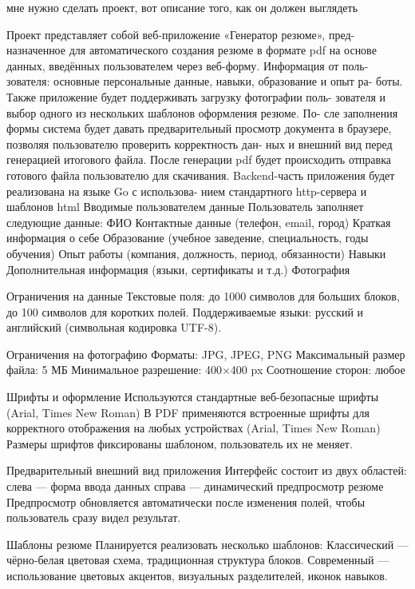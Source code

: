 \documentclass[a4paper, 14pt]{extarticle} %
\begin{document}
\begin{PromptBlock}
мне нужно сделать проект, вот описание того, как он должен выглядеть

Проект представляет собой веб-приложение «Генератор резюме», пред-
назначенное для автоматического создания резюме в формате pdf на основе
данных, введённых пользователем через веб-форму. Информация от поль-
зователя: основные персональные данные, навыки, образование и опыт ра-
боты. Также приложение будет поддерживать загрузку фотографии поль-
зователя и выбор одного из нескольких шаблонов оформления резюме. По-
сле заполнения формы система будет давать предварительный просмотр
документа в браузере, позволяя пользователю проверить корректность дан-
ных и внешний вид перед генерацией итогового файла. После генерации pdf
будет происходить отправка готового файла пользователю для скачивания.
Backend-часть приложения будет реализована на языке Go с использова-
нием стандартного http-сервера и шаблонов html
Вводимые пользователем данные
Пользователь заполняет следующие данные:
ФИО
Контактные данные (телефон, email, город)
Краткая информация о себе
Образование (учебное заведение, специальность, годы обучения)
Опыт работы (компания, должность, период, обязанности)
Навыки
Дополнительная информация (языки, сертификаты и т.д.)
Фотография

Ограничения на данные
Текстовые поля: до 1000 символов для больших блоков, до 100 символов для коротких полей.
Поддерживаемые языки: русский и английский (символьная кодировка UTF-8).

Ограничения на фотографию
Форматы: JPG, JPEG, PNG
Максимальный размер файла: 5 МБ
Минимальное разрешение: 400×400 px
Соотношение сторон: любое 

Шрифты и оформление
Используются стандартные веб-безопасные шрифты (Arial, Times New Roman)
В PDF применяются встроенные шрифты для корректного отображения на любых устройствах (Arial, Times New Roman)
Размеры шрифтов фиксированы шаблоном, пользователь их не меняет.

Предварительный внешний вид приложения
Интерфейс состоит из двух областей:
слева — форма ввода данных
справа — динамический предпросмотр резюме
Предпросмотр обновляется автоматически после изменения полей, чтобы пользователь сразу видел результат.

Шаблоны резюме
Планируется реализовать несколько шаблонов:
Классический — чёрно-белая цветовая схема, традиционная структура блоков.
Современный — использование цветовых акцентов, визуальных разделителей, иконок навыков.

\end{PromptBlock}
\end{document}
